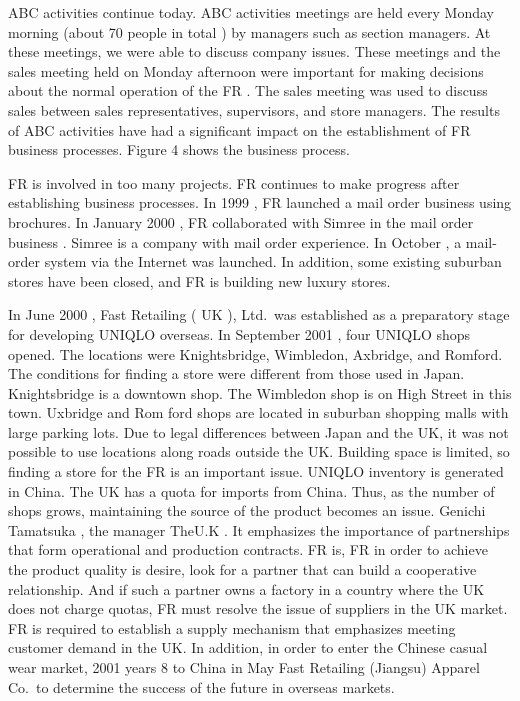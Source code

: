 \documentclass[12pt,]{article}
\begin{document}
ABC activities continue today. ABC activities meetings are held every
Monday morning (about 70 people in total ) by managers such as section
managers. At these meetings, we were able to discuss company issues.
These meetings and the sales meeting held on Monday afternoon were
important for making decisions about the normal operation of the FR .
The sales meeting was used to discuss sales between sales
representatives, supervisors, and store managers. The results of ABC
activities have had a significant impact on the establishment of FR
business processes. Figure 4 shows the business process.

FR is involved in too many projects. FR continues to make progress after
establishing business processes. In 1999 , FR launched a mail order
business using brochures. In January 2000 , FR collaborated with Simree
in the mail order business . Simree is a company with mail order
experience. In October , a mail-order system via the Internet was
launched. In addition, some existing suburban stores have been closed,
and FR is building new luxury stores.

In June 2000 , Fast Retailing ( UK ), Ltd.~was established as a
preparatory stage for developing UNIQLO overseas. In September 2001 ,
four UNIQLO shops opened. The locations were Knightsbridge, Wimbledon,
Axbridge, and Romford. The conditions for finding a store were different
from those used in Japan. Knightsbridge is a downtown shop. The
Wimbledon shop is on High Street in this town. Uxbridge and Rom ford
shops are located in suburban shopping malls with large parking lots.
Due to legal differences between Japan and the UK, it was not possible
to use locations along roads outside the UK. Building space is limited,
so finding a store for the FR is an important issue. UNIQLO inventory is
generated in China. The UK has a quota for imports from China. Thus, as
the number of shops grows, maintaining the source of the product becomes
an issue. Genichi Tamatsuka , the manager TheU.K . It emphasizes the
importance of partnerships that form operational and production
contracts. FR is, FR in order to achieve the product quality is desire,
look for a partner that can build a cooperative relationship. And if
such a partner owns a factory in a country where the UK does not charge
quotas, FR must resolve the issue of suppliers in the UK market. FR is
required to establish a supply mechanism that emphasizes meeting
customer demand in the UK. In addition, in order to enter the Chinese
casual wear market, 2001 years 8 to China in May Fast Retailing
(Jiangsu) Apparel Co.~to determine the success of the future in overseas
markets.
\end{document}
